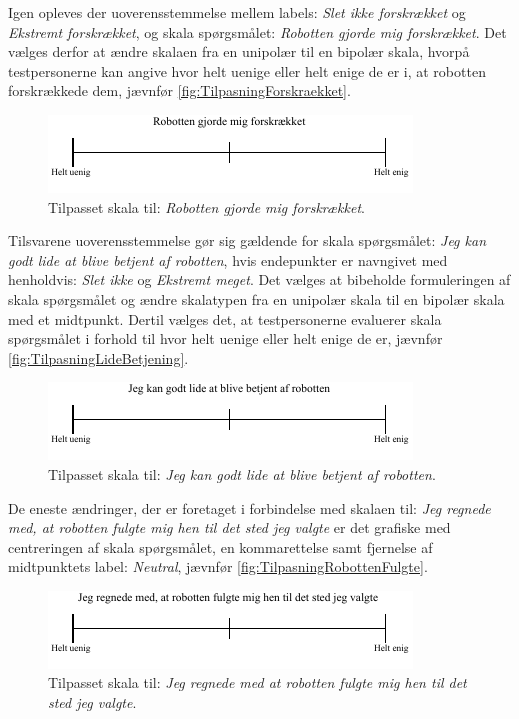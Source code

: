 Igen opleves der uoverensstemmelse mellem labels: \textit{Slet ikke forskrækket} og \textit{Ekstremt forskrækket}, og skala spørgsmålet: \textit{Robotten gjorde mig forskrækket}. Det vælges derfor at ændre skalaen fra en unipolær til en bipolær skala, hvorpå testpersonerne kan angive hvor helt uenige eller helt enige de er i, at robotten forskrækkede dem, jævnfør \autoref{fig:TilpasningForskraekket}.
%
\begin{figure}[H]
\centering
\includegraphics[width =\textwidth]{Figure/TilpasningAfSkalaer/TilpassetForskraekket} 
\caption{Tilpasset skala til: \textit{Robotten gjorde mig forskrækket}.}
\label{fig:TilpasningForskraekket}
\end{figure}
\noindent
% 
Tilsvarene uoverensstemmelse gør sig gældende for skala spørgsmålet: \textit{Jeg kan godt lide at blive betjent af robotten}, hvis endepunkter er navngivet med henholdvis: \textit{Slet ikke} og \textit{Ekstremt meget}. Det vælges at bibeholde formuleringen af skala spørgsmålet og ændre skalatypen fra en unipolær skala til en bipolær skala med et midtpunkt. Dertil vælges det, at testpersonerne evaluerer skala spørgsmålet i forhold til hvor helt uenige eller helt enige de er, jævnfør \autoref{fig:TilpasningLideBetjening}.   
%
\begin{figure}[H]
\centering
\includegraphics[width =\textwidth]{Figure/TilpasningAfSkalaer/TilpassetLideBetjening} 
\caption{Tilpasset skala til: \textit{Jeg kan godt lide at blive betjent af robotten}.}
\label{fig:TilpasningLideBetjening}
\end{figure}
\noindent
% 
De eneste ændringer, der er foretaget i forbindelse med skalaen til: \textit{Jeg regnede med, at robotten fulgte mig hen til det sted jeg valgte} er det grafiske med centreringen af skala spørgsmålet, en kommarettelse samt fjernelse af midtpunktets label: \textit{Neutral}, jævnfør \autoref{fig:TilpasningRobottenFulgte}.
%
\begin{figure}[H]
\centering
\includegraphics[width =\textwidth]{Figure/TilpasningAfSkalaer/TilpassetRobottenFulgteMigDetRigtigeStedHen} 
\caption{Tilpasset skala til: \textit{Jeg regnede med at robotten fulgte mig hen til det sted jeg valgte}.}
\label{fig:TilpasningRobottenFulgte}
\end{figure}
